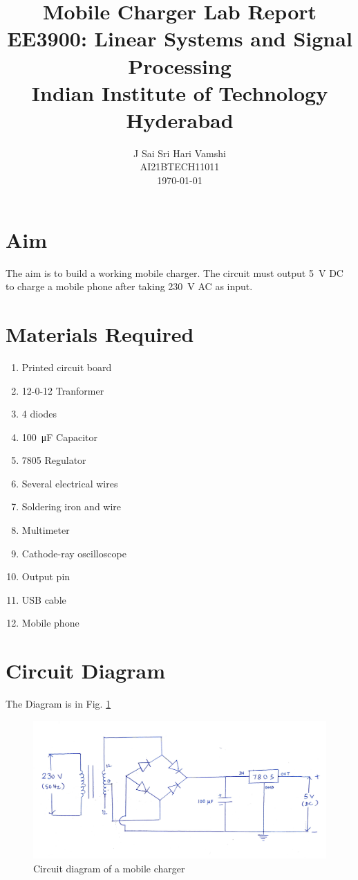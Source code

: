 \documentclass[journal,12pt,twocolumn]{IEEEtran}
\title{Mobile Charger Lab Report \\ \Large EE3900: Linear Systems and Signal Processing \\ \large Indian Institute of Technology Hyderabad}
\author{J Sai Sri Hari Vamshi \\ \normalsize AI21BTECH11011 \\ \vspace*{20pt} \normalsize \today}
\numberwithin{equation}{section}
\numberwithin{figure}{section}
\renewcommand\thesection{\arabic{section}}
\begin{document}
	\maketitle
	\tableofcontents

	\section{Aim}
		The aim is to build a working mobile charger. The circuit must output \SI{5}{\volt} DC to charge a mobile phone after taking \SI{230}{\volt} AC as input.
	
	\section{Materials Required}
	\begin{enumerate}[label=\arabic*,ref=\thesection.\theenumi]
		\item Printed circuit board
		\item 12-0-12 Tranformer
		\item 4 diodes
		\item \SI{100}{\micro\farad} Capacitor
		\item 7805 Regulator
		\item Several electrical wires
		\item Soldering iron and wire
		\item Multimeter
		\item Cathode-ray oscilloscope
		\item Output pin
		\item USB cable
		\item Mobile phone
	\end{enumerate}

	\section{Circuit Diagram}
	
	The Diagram is in Fig. \ref{fig-ckt}\\
	\begin{figure}[!ht]
		\centering
		\includegraphics[width=\columnwidth]{./figs/circuit_diagram}
		\caption{Circuit diagram of a mobile charger}
		\label{fig-ckt}	
	\end{figure}
	
\end{document}
